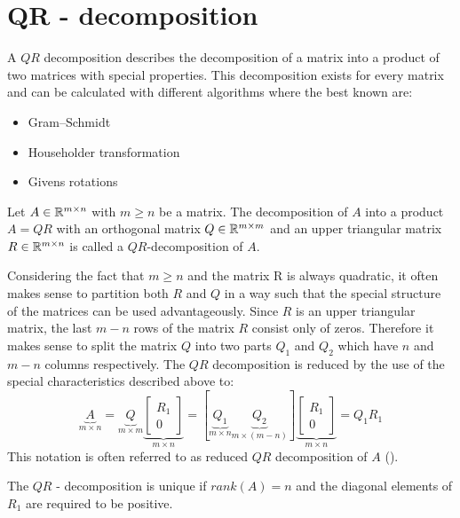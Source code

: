 \section{QR - decomposition}

A $QR$ decomposition describes the decomposition of a matrix into a product of two matrices with special properties. This decomposition exists for every matrix and can be calculated with different algorithms where the best known are:

\begin{itemize}
	\item Gram–Schmidt
	\item Householder transformation
	\item Givens rotations
\end{itemize}

\begin{definition}
	Let $A \in \mathbb{R}^{m \times n}$ with $m \geq n$ be a matrix. The decomposition of $A$ into a product $A = QR$ with an orthogonal matrix $Q \in \mathbb{R}^{m \times m}$ and an upper triangular matrix $R \in \mathbb{R}^{m \times n}$ is called a $QR$-decomposition of $A$. 
\end{definition}

Considering the fact that $m \geq n$ and the matrix R is always quadratic, it often makes sense to partition both $R$ and $Q$ in a way such that the special structure of the matrices can be used advantageously. Since $R$ is an upper triangular matrix, the last $m-n$ rows of the matrix $R$ consist only of zeros. Therefore it makes sense to split the matrix $Q$ into two parts $Q_1$ and $Q_2$ which have $n$ and $m-n$ columns respectively. The $QR$ decomposition is reduced by the use of the special characteristics described above to:
\begin{equation}\label{equ:thin_QR}
	\underbrace{A}_{m \times n} =  \underbrace{Q}_{m \times m} \underbrace{\begin{bmatrix} R_1 \\ 0 \end{bmatrix}}_{m \times n} = [\underbrace{Q_1}_{m \times n} \underbrace{Q_2}_{m \times (m-n)} ]  \underbrace{\begin{bmatrix} R_1 \\ 0 \end{bmatrix}}_{m \times n} = Q_1 R_1
\end{equation}
This notation is often referred to as reduced $QR$ decomposition of $A$ (\cite{trefethen1997numerical}).

\begin{remark} The $QR$ - decomposition is unique if $rank(A) = n$ and the diagonal elements of $R_1$ are required to be positive.
\end{remark}

